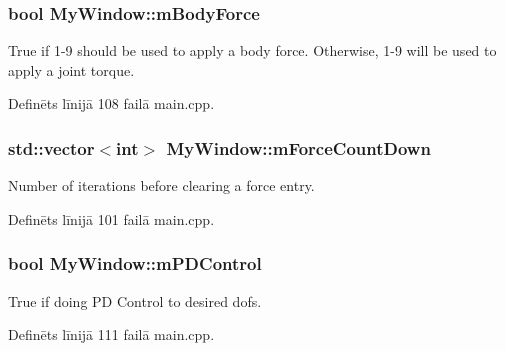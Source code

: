 \subsubsection[{\texorpdfstring{m\+Body\+Force}{mBodyForce}}]{\setlength{\rightskip}{0pt plus 5cm}bool My\+Window\+::m\+Body\+Force\hspace{0.3cm}{\ttfamily [protected]}}\hypertarget{class_my_window_a99865aead6e9ed47b7f6303e50ec1dff}{}\label{class_my_window_a99865aead6e9ed47b7f6303e50ec1dff}
True if 1-\/9 should be used to apply a body force. Otherwise, 1-\/9 will be used to apply a joint torque. 

Definēts līnijā 108 failā main.\+cpp.

\subsubsection[{\texorpdfstring{m\+Force\+Count\+Down}{mForceCountDown}}]{\setlength{\rightskip}{0pt plus 5cm}std\+::vector$<$int$>$ My\+Window\+::m\+Force\+Count\+Down\hspace{0.3cm}{\ttfamily [protected]}}\hypertarget{class_my_window_a41b65319bbba6d3154fa70e242c75cee}{}\label{class_my_window_a41b65319bbba6d3154fa70e242c75cee}


Number of iterations before clearing a force entry. 



Definēts līnijā 101 failā main.\+cpp.

\subsubsection[{\texorpdfstring{m\+P\+D\+Control}{mPDControl}}]{\setlength{\rightskip}{0pt plus 5cm}bool My\+Window\+::m\+P\+D\+Control\hspace{0.3cm}{\ttfamily [protected]}}\hypertarget{class_my_window_a83c40a43fe1ee6e080dbe918d4753cf3}{}\label{class_my_window_a83c40a43fe1ee6e080dbe918d4753cf3}


True if doing PD Control to desired dofs. 



Definēts līnijā 111 failā main.\+cpp.

